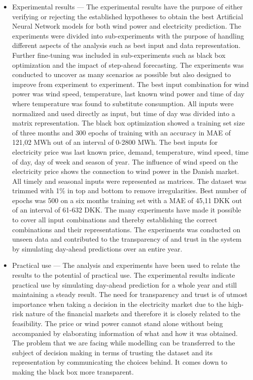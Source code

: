 \begin{itemize}
\item Experimental results --- The experimental results have the purpose of either verifying or rejecting the established hypotheses to obtain the best Artificial Neural Network models for both wind power and electricity prediction. The experiments were divided into sub-experiments with the purpose of handling different aspects of the analysis such as best input and data representation. Further fine-tuning was included in sub-experiments such as black box optimization and the impact of step-ahead forecasting. The experiments was conducted to uncover as many scenarios as possible but also designed to improve from experiment to experiment. The best input combination for wind power was wind speed, temperature, last known wind power and time of day where temperature was found to substitute consumption. All inputs were normalized and used directly as input, but time of day was divided into a matrix representation. The black box optimization showed a training set size of three months and 300 epochs of training with an accuracy in MAE of 121,02 MWh out of an interval of 0-2800 MWh. The best inputs for electricity price was last known price, demand, temperature, wind speed, time of day, day of week and season of year. The influence of wind speed on the electricity price shows the connection to wind power in the Danish market. All timely and seasonal inputs were represented as matrices. The dataset was trimmed with 1\% in top and bottom to remove irregularities. Best number of epochs was 500 on a six months training set with a MAE of 45,11 DKK out of an interval of 61-632 DKK. The many experiments have made it possible to cover all input combinations and thereby establishing the correct combinations and their representations. The experiments was conducted on unseen data and contributed to the transparency of and trust in the system by simulating day-ahead predictions over an entire year.
\item Practical use --- The analysis and experiments have been used to relate the results to the potential of practical use. The experimental results indicate practical use by simulating day-ahead prediction for a whole year and still maintaining a steady result. The need for transparency and trust is of utmost importance when taking a decision in the electricity market due to the high-risk nature of the financial markets and therefore it is closely related to the feasibility. The price or wind power cannot stand alone without being accompanied by elaborating information of what and how it was obtained. The problem that we are facing while modelling can be transferred to the subject of decision making in terms of trusting the dataset and its representation by communicating the choices behind. It comes down to making the black box more transparent.
\end{itemize}

